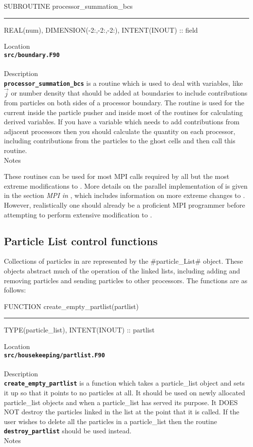 \documentclass[12pt,a4paper]{article}
\newcommand{\HRule}{\rule[0.3cm]{\linewidth}{0.5mm}}
\newcommand{\inlinecode}[1]{{\color{warwickred} \bf\texttt{#1}}}
\newcommand{\EPOCH}{{\color{warwickdark}\fontfamily{phv}\selectfont{EPOCH}}}
\begin{document}
\pagebreak
\begin{codedef}
SUBROUTINE processor_summation_bcs
\HRule
REAL(num), DIMENSION(-2:,-2:,-2:), INTENT(INOUT) :: field
\end{codedef}
\vspace{1cm}
{\Large Location\\}
\inlinecode{src/boundary.F90}\\
\\[0.5cm]
{\Large Description\\}
\inlinecode{processor\_summation\_bcs} is a routine which is used to deal with
variables, like $\vec{j}$ or number density that should be added at boundaries
to include contributions from particles on both sides of a processor boundary.
The routine is used for the current inside the particle pusher and inside most
of the routines for calculating derived variables. If you have a variable
which needs to add contributions from adjacent processors then you should
calculate the quantity on each processor, including contributions from the
particles to the ghost cells and then call this routine.
\\[0.5cm]
{\Large Notes\\}
\pagebreak

These routines can be used for most MPI calls required by all but the most
extreme modifications to {\EPOCH}. More details on the parallel
implementation of {\EPOCH} is given in the section {\it MPI in \EPOCH}, which
includes information on more extreme changes to {\EPOCH}. However,
realistically one should already be a proficient MPI programmer before
attempting to perform extensive modification to {\EPOCH}.

\subsection{Particle List control functions}
Collections of particles in {\EPOCH} are represented by the #particle_List#
object. These objects abstract much of the operation of the linked lists,
including adding and removing particles and sending particles to other
processors. The functions are as follows:

\pagebreak
\begin{codedef}
FUNCTION create_empty_partlist(partlist)
\HRule
TYPE(particle_list), INTENT(INOUT) :: partlist
\end{codedef}
\vspace{1cm}
{\Large Location\\}
\inlinecode{src/housekeeping/partlist.F90}\\
\\[0.5cm]
{\Large Description\\}
\inlinecode{create\_empty\_partlist} is a function which takes a particle\_list
object and sets it up so that it points to no particles at all. It should be
used on newly allocated particle\_list objects and when a particle\_list has
served its purpose. It DOES NOT destroy the particles linked in the list at
the point that it is called. If the user wishes to delete all the particles in a
particle\_list then the routine \inlinecode{destroy\_partlist} should be used
instead.
\\[0.5cm]
{\Large Notes\\}
\end{document}
